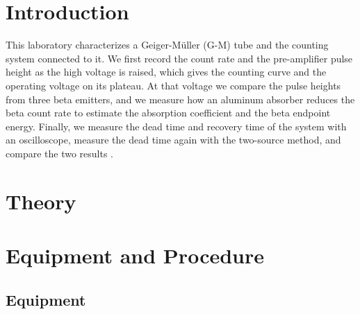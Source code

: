 \documentclass[12pt]{article}
\begin{document}
\tableofcontents

\newpage

\begin{abstract}

{}


\end{abstract}


\section{Introduction}

This laboratory characterizes a Geiger-M\"uller (G-M) tube and the counting system connected to it. We first record the count rate and the pre-amplifier pulse height as the high voltage is raised, which gives the counting curve and the operating voltage on its plateau. At that voltage we compare the pulse heights from three beta emitters, and we measure how an aluminum absorber reduces the beta count rate to estimate the absorption coefficient and the beta endpoint energy. Finally, we measure the dead time and recovery time of the system with an oscilloscope, measure the dead time again with the two-source method, and compare the two results \cite{labmanual}.


\section{Theory}



\section{Equipment and Procedure}

\subsection{Equipment}
\end{document}
